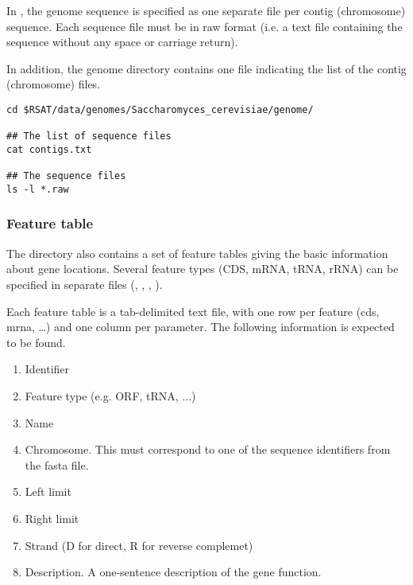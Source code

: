 In \RSAT, the genome sequence is specified as one separate file per
contig (chromosome) sequence. Each sequence file must be in raw format
(i.e. a text file containing the sequence without any space or
carriage return). 

In addition, the genome directory contains one file indicating the
list of the contig (chromosome) files.

\begin{footnotesize}
\begin{verbatim}
cd $RSAT/data/genomes/Saccharomyces_cerevisiae/genome/

## The list of sequence files
cat contigs.txt

## The sequence files
ls -l *.raw

\end{verbatim}
\end{footnotesize}

\subsubsection{Feature table}

The  directory also contains a set of feature tables
giving the basic information about gene locations. Several feature
types (CDS, mRNA, tRNA, rRNA) can be specified in separate files
(, , , ).

Each feature table is a tab-delimited text file, with one row per
feature (cds, mrna, \ldots) and one column per parameter. The
following information is expected to be found.

\begin{enumerate}

\item Identifier

\item Feature type (e.g. ORF, tRNA, ...)

\item Name

\item Chromosome. This must correspond to one of the sequence
identifiers from the fasta file.

\item Left limit

\item Right limit

\item Strand (D for direct, R for reverse complemet)

\item Description. A one-sentence description of the gene function.

\end{enumerate}


